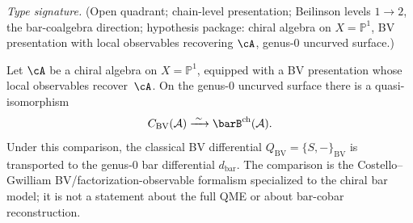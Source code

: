 \begin{theorem}
\label{thm:bv-bar-geometric}
\emph{Type signature.} (Open quadrant; chain-level presentation;
Beilinson levels $1\to 2$, the bar-coalgebra direction; hypothesis
package: chiral algebra on $X=\mathbb{P}^1$, BV presentation with
local observables recovering $\cA$, genus-$0$ uncurved surface.)

Let $\cA$ be a chiral algebra on $X = \mathbb{P}^1$, equipped with a
BV presentation whose local observables recover~$\cA$. On the
genus-$0$ uncurved surface there is a quasi-isomorphism
\[
C_{\mathrm{BV}}(\mathcal{A}) \xrightarrow{\;\sim\;}
\barB^{\mathrm{ch}}(\mathcal{A}).
\]
Under this comparison, the classical BV differential
$Q_{\mathrm{BV}}=\{S,-\}_{\mathrm{BV}}$ is transported to the
genus-$0$ bar differential $d_{\mathrm{bar}}$. The comparison is the
Costello--Gwilliam BV/factorization-observable formalism specialized
to the chiral bar model; it is not a statement about the full QME or
about bar-cobar reconstruction.
\end{theorem}

